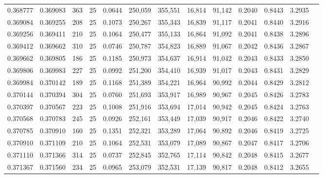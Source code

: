 \begin{tabular}{rrrrrrrrrrrrr}
0.368777 & 0.369083 &   363 &  25 &                                     0.0644 & 250,059 & 355,551 &  16,814 &  91,142 & 0.2040 & 0.8443 & 3.2935 \\
0.369084 & 0.369255 &   208 &  25 &                                     0.1073 & 250,267 & 355,343 &  16,839 &  91,117 & 0.2041 & 0.8440 & 3.2916 \\
0.369256 & 0.369411 &   210 &  25 &                                     0.1064 & 250,477 & 355,133 &  16,864 &  91,092 & 0.2041 & 0.8438 & 3.2896 \\
0.369412 & 0.369662 &   310 &  25 &                                     0.0746 & 250,787 & 354,823 &  16,889 &  91,067 & 0.2042 & 0.8436 & 3.2867 \\
0.369662 & 0.369805 &   186 &  25 &                                     0.1185 & 250,973 & 354,637 &  16,914 &  91,042 & 0.2043 & 0.8433 & 3.2850 \\
0.369806 & 0.369983 &   227 &  25 &                                     0.0992 & 251,200 & 354,410 &  16,939 &  91,017 & 0.2043 & 0.8431 & 3.2829 \\
0.369984 & 0.370142 &   189 &  25 &                                     0.1168 & 251,389 & 354,221 &  16,964 &  90,992 & 0.2044 & 0.8429 & 3.2812 \\
0.370144 & 0.370394 &   304 &  25 &                                     0.0760 & 251,693 & 353,917 &  16,989 &  90,967 & 0.2045 & 0.8426 & 3.2783 \\
0.370397 & 0.370567 &   223 &  25 &                                     0.1008 & 251,916 & 353,694 &  17,014 &  90,942 & 0.2045 & 0.8424 & 3.2763 \\
0.370568 & 0.370783 &   245 &  25 &                                     0.0926 & 252,161 & 353,449 &  17,039 &  90,917 & 0.2046 & 0.8422 & 3.2740 \\
0.370785 & 0.370910 &   160 &  25 &                                     0.1351 & 252,321 & 353,289 &  17,064 &  90,892 & 0.2046 & 0.8419 & 3.2725 \\
0.370910 & 0.371109 &   210 &  25 &                                     0.1064 & 252,531 & 353,079 &  17,089 &  90,867 & 0.2047 & 0.8417 & 3.2706 \\
0.371110 & 0.371366 &   314 &  25 &                                     0.0737 & 252,845 & 352,765 &  17,114 &  90,842 & 0.2048 & 0.8415 & 3.2677 \\
0.371367 & 0.371560 &   234 &  25 &                                     0.0965 & 253,079 & 352,531 &  17,139 &  90,817 & 0.2048 & 0.8412 & 3.2655 \\

\end{tabular}
